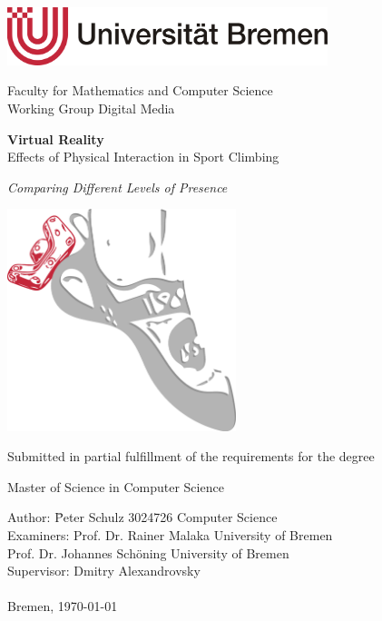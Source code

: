 \begin{titlepage}
	\begin{spacing}{1}
	\begin{center}
		{\sffamily%
			
		\includegraphics[width=0.7\textwidth]{include/images/uni-bremen-logo.pdf}  
		
		\vspace{0.5\baselineskip}
		{\Large Faculty for Mathematics and Computer Science\\Working Group Digital Media}
		
		\vspace{5\baselineskip}
		{\LARGE \textbf{Virtual Reality}\\		\vspace{0.25\baselineskip}Effects of Physical Interaction in Sport Climbing}
		
		\vspace{0.75\baselineskip}
		{\LARGE \textit{Comparing Different Levels of Presence}}		
		
		\includegraphics[width=0.5\textwidth]{include/images/foot-with-tracker.pdf} 
		
		\vspace{5\baselineskip}
		{\Large Submitted in partial fulfillment of the requirements for the degree}
		
		\vspace{0.5\baselineskip}
		{\Large Master of Science in Computer Science}
		
		\parbox{0cm}{%
			\vspace{6\baselineskip}	
			\Large
			\begin{tabbing}
				Author: \qquad \= Peter Schulz \cdot{} 3024726 \cdot{} Computer Science\\
				Examiners: \> Prof. Dr. Rainer Malaka \cdot{} University of Bremen\\
				\> Prof. Dr. Johannes Schöning \cdot{} University of Bremen\\
				Supervisor: \> Dmitry Alexandrovsky
				\\
				\\
				Bremen, \today
			\end{tabbing}
		}}
	\end{center}
	\end{spacing}
\end{titlepage}

\setcounter{page}{0}